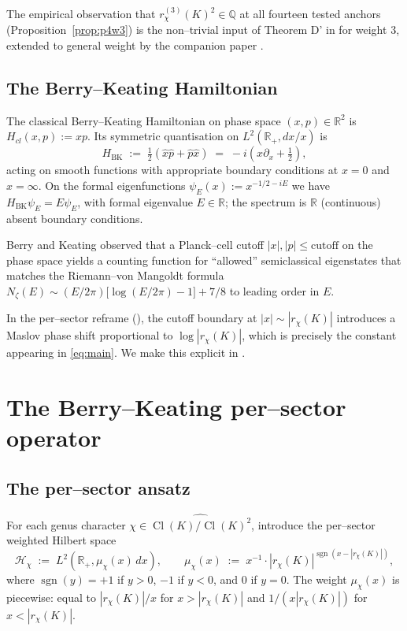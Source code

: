 \documentclass[11pt]{amsart}
\theoremstyle{definition}
\theoremstyle{remark}
\DeclareMathOperator{\Cl}{Cl}
\DeclareMathOperator{\sgn}{sgn}
\newcommand{\Q}{\mathbb{Q}}
\newcommand{\R}{\mathbb{R}}
\newcommand{\BK}{\mathrm{BK}}
\begin{document}
The empirical observation that
\(r_\chi^{(3)}(K)^2 \in \Q\) at all fourteen tested anchors
(Proposition~\ref{prop:p4w3}) is the non--trivial input of
Theorem D' in \cite{Schutt2008} for weight \(3\), extended to general
weight by the companion paper \cite{Remondiere2026bsd}.

\subsection{The Berry--Keating Hamiltonian}\label{ssec:BK-classical}
The classical Berry--Keating Hamiltonian on phase space
\((x, p) \in \R^2\) is \(H_{cl}(x, p) := xp\). Its symmetric quantisation
on \(L^2(\R_+, dx/x)\) is
\begin{equation}\label{eq:BK}
   H_{\BK} \;:=\;
   \tfrac{1}{2}(\hat x \hat p + \hat p \hat x)
   \;=\;
   -i\!\left( x \partial_x + \tfrac{1}{2} \right) ,
\end{equation}
acting on smooth functions with appropriate boundary conditions at
\(x = 0\) and \(x = \infty\). On the formal eigenfunctions
\(\psi_E(x) := x^{-1/2 - i E}\) we have
\(H_{\BK} \psi_E = E\psi_E\), with formal eigenvalue \(E \in \R\); the
spectrum is \(\R\) (continuous) absent boundary conditions.

Berry and Keating \cite{BerryKeating1999a,BerryKeating1999b} observed
that a Planck--cell cutoff
\(|x|, |p| \le \mathrm{cutoff}\) on the phase space yields a
counting function for ``allowed'' semiclassical eigenstates that
matches the Riemann--von Mangoldt formula
\(N_\zeta(E) \sim (E/2\pi)\bigl[\log(E/2\pi) - 1\bigr] + 7/8\) to
leading order in \(E\).

In the per--sector reframe (), the cutoff
boundary at \(|x| \sim |r_\chi(K)|\) introduces a Maslov phase shift
proportional to \(\log|r_\chi(K)|\), which is precisely the constant
appearing in \eqref{eq:main}. We make this explicit in
.

\section{The Berry--Keating per--sector operator}\label{sec:per-sector}

\subsection{The per--sector ansatz}\label{ssec:ansatz}
For each genus character
\(\chi \in \widehat{\Cl(K)/\Cl(K)^2}\), introduce the per--sector
weighted Hilbert space
\begin{equation}\label{eq:H-chi}
   \mathcal H_\chi
   \;:=\;
   L^2(\R_+, \mu_\chi(x)\,dx) ,
   \qquad
   \mu_\chi(x) \;:=\; x^{-1} \cdot |r_\chi(K)|^{\sgn(x - |r_\chi(K)|)} ,
\end{equation}
where \(\sgn(y) = +1\) if \(y > 0\), \(-1\) if \(y < 0\), and \(0\) if
\(y = 0\). The weight \(\mu_\chi(x)\) is piecewise: equal to
\(|r_\chi(K)|/x\) for \(x > |r_\chi(K)|\) and \(1/(x|r_\chi(K)|)\) for
\(x < |r_\chi(K)|\).
\end{document}
